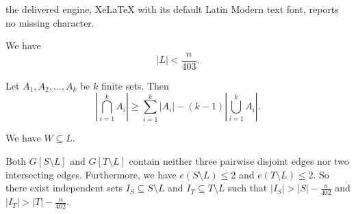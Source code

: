 \documentclass[10pt,a4paper]{amsart}
\begin{document}
the delivered engine, XeLaTeX with its default Latin Modern text font, reports no missing character.
\begin{lemma}\label{Lupper}  
We have 
$$|L|< \frac{n}{403}.$$
\end{lemma}

\begin{lemma}\label{set}
Let $A_1, A_2,\dots, A_k$ be $k$  finite sets. Then
\begin{equation*}
\left| \bigcap_{i=1}^k A_i \right| \ge \sum_{i=1}^k |A_i|-(k-1)\left|\bigcup_{i=1}^k A_i\right|.
\end{equation*}
\end{lemma}

  \begin{lemma} \label{lem-W-sub-L}
  We have $W \subseteq L$. 
  \end{lemma}

\begin{lemma}  \label{lem-one-edge}
Both $G[S\setminus L]$ and $G[T\setminus L] $ 
 contain neither three pairwise disjoint edges nor two intersecting edges.   
Furthermore, 
we have $e(S\setminus L) \le 2$ and 
$e(T\setminus L) \le 2$. So 
there exist independent sets
 $I_S\subseteq S\setminus L$  and $I_T\subseteq T\setminus L$ such that
$ |I_S|>  |S|- \frac{n}{402} $ and $|I_T|> |T|- \frac{n}{402} $. 
 \end{lemma}
\end{document}
